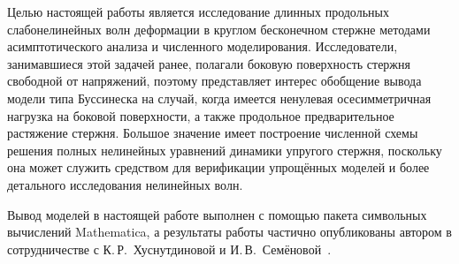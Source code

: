 \documentclass[12pt, a4paper]{report}
\begin{document}
Целью настоящей работы является исследование длинных продольных слабонелинейных волн деформации в круглом бесконечном стержне методами асимптотического анализа и численного моделирования. Исследователи, занимавшиеся этой задачей ранее, полагали боковую поверхность стержня свободной от напряжений, поэтому представляет интерес обобщение вывода модели типа Буссинеска на случай, когда имеется ненулевая осесимметричная нагрузка на боковой поверхности, а также продольное предварительное растяжение стержня.
Большое значение имеет построение численной схемы решения полных нелинейных уравнений динамики упругого стержня, поскольку она может служить средством для верификации упрощённых моделей и более детального исследования нелинейных волн.

Вывод моделей в настоящей работе выполнен с помощью пакета символьных вычислений Mathematica, а результаты работы частично опубликованы автором в сотрудничестве с К.\,Р.~Хуснутдиновой и И.\,В.~Семёновой~\cite{Garbuzov}.

\end{document}
